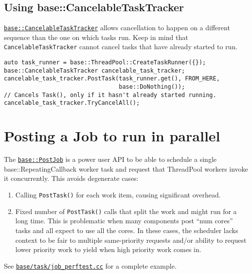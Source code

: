 \documentclass[a4paper,12pt,notitlepage,twoside,openright]{article}
\begin{document}
\hypertarget{using-basecancelabletasktracker}{%
\subsection{Using
base::CancelableTaskTracker}\label{using-basecancelabletasktracker}}

\href{https://cs.chromium.org/chromium/src/base/task/cancelable_task_tracker.h}{\texttt{base::CancelableTaskTracker}}
allows cancellation to happen on a different sequence than the one on
which tasks run. Keep in mind that \texttt{CancelableTaskTracker} cannot
cancel tasks that have already started to run.

\begin{verbatim}
auto task_runner = base::ThreadPool::CreateTaskRunner({});
base::CancelableTaskTracker cancelable_task_tracker;
cancelable_task_tracker.PostTask(task_runner.get(), FROM_HERE,
                                 base::DoNothing());
// Cancels Task(), only if it hasn't already started running.
cancelable_task_tracker.TryCancelAll();
\end{verbatim}

\hypertarget{posting-a-job-to-run-in-parallel}{%
\section{Posting a Job to run in
parallel}\label{posting-a-job-to-run-in-parallel}}

The
\href{https://cs.chromium.org/chromium/src/base/task/post_job.h}{\texttt{base::PostJob}}
is a power user API to be able to schedule a single
base::RepeatingCallback worker task and request that ThreadPool workers
invoke it concurrently. This avoids degenerate cases:

\begin{enumerate}
  \item Calling
  \texttt{PostTask()} for each work item, causing significant overhead.
  \item Fixed number of \texttt{PostTask()} calls that split the work and might
  run for a long time. This is problematic when many components post ``num
  cores'' tasks and all expect to use all the cores. In these cases, the
  scheduler lacks context to be fair to multiple same-priority requests
  and/or ability to request lower priority work to yield when high
  priority work comes in.
\end{enumerate}

See
\href{https://cs.chromium.org/chromium/src/base/task/job_perftest.cc}{\texttt{base/task/job\_perftest.cc}}
for a complete example.
\end{document}
